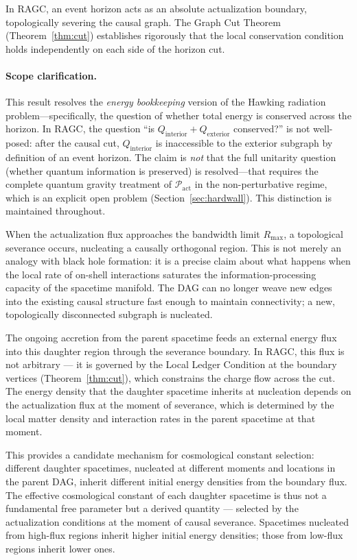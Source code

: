 \documentclass[11pt,a4paper]{article}
\theoremstyle{plain}
\theoremstyle{definition}
\theoremstyle{remark}
\newcommand{\Pact}{\mathcal{P}_{\mathrm{act}}}
\newcommand{\Rmax}{R_{\mathrm{max}}}
\begin{document}
In RAGC, an event horizon acts as an absolute actualization boundary,
topologically severing the causal graph. The Graph Cut Theorem
(Theorem~\ref{thm:cut}) establishes rigorously that the local conservation
condition holds independently on each side of the horizon cut.

\paragraph{Scope clarification.}
This result resolves the \emph{energy bookkeeping} version of the Hawking
radiation problem---specifically, the question of whether total energy is conserved
across the horizon. In RAGC, the question ``is $Q_{\mathrm{interior}} +
Q_{\mathrm{exterior}}$ conserved?'' is not well-posed: after the causal cut,
$Q_{\mathrm{interior}}$ is inaccessible to the exterior subgraph by definition of
an event horizon. The claim is \emph{not} that the full unitarity question (whether
quantum information is preserved) is resolved---that requires the complete quantum
gravity treatment of $\Pact$ in the non-perturbative regime, which is an explicit
open problem (Section~\ref{sec:hardwall}). This distinction is maintained
throughout.

When the actualization flux approaches the bandwidth limit $\Rmax$, a topological
severance occurs, nucleating a causally orthogonal region. This is not merely an
analogy with black hole formation: it is a precise claim about what happens when
the local rate of on-shell interactions saturates the information-processing
capacity of the spacetime manifold. The DAG can no longer weave new edges into the
existing causal structure fast enough to maintain connectivity; a new, topologically
disconnected subgraph is nucleated.

The ongoing accretion from the parent spacetime feeds an external energy flux into
this daughter region through the severance boundary. In RAGC, this flux is not
arbitrary --- it is governed by the Local Ledger Condition at the boundary vertices
(Theorem~\ref{thm:cut}), which constrains the charge flow across the cut. The
energy density that the daughter spacetime inherits at nucleation depends on the
actualization flux at the moment of severance, which is determined by the local
matter density and interaction rates in the parent spacetime at that moment.

This provides a candidate mechanism for cosmological constant selection: different
daughter spacetimes, nucleated at different moments and locations in the parent
DAG, inherit different initial energy densities from the boundary flux. The
effective cosmological constant of each daughter spacetime is thus not a
fundamental free parameter but a derived quantity --- selected by the actualization
conditions at the moment of causal severance. Spacetimes nucleated from high-flux
regions inherit higher initial energy densities; those from low-flux regions
inherit lower ones.
\end{document}
